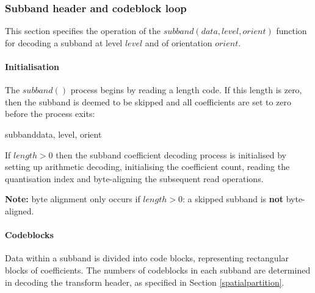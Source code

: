 \subsubsection{Subband header and codeblock loop}

This section specifies the operation of the $subband(data, level, orient)$
function for decoding a subband at level $level$ and of orientation $orient$.

\paragraph{Initialisation\newline}

The $subband()$ process begins by reading a length code. If this length is
zero, then the subband is deemed to be skipped and all coefficients are set to zero
before the process exits:

\begin{pseudo}{subband}{data, level, orient}
    \bsEND
  \bsEND
  \bsRET{}
\bsEND
\bsCODE{\hdots}
\end{pseudo}

If $length>0$ then the subband coefficient decoding process is initialised by
setting up arithmetic decoding, initialising the coefficient count, reading
the quantisation index and byte-aligning the subsequent read operations.

\begin{pseudo*}
\bsEND
{}
\bsCODE{\hdots}
\end{pseudo*}

{\bf Note:} byte alignment only occurs if $length>0$: a skipped 
subband is {\bf not} byte-aligned.

\paragraph{Codeblocks\newline}

Data within a subband is divided into code blocks,
representing rectangular blocks of coefficients. The numbers of codeblocks
in each subband are determined in decoding the transform header, as specified
in Section \ref{spatialpartition}.

